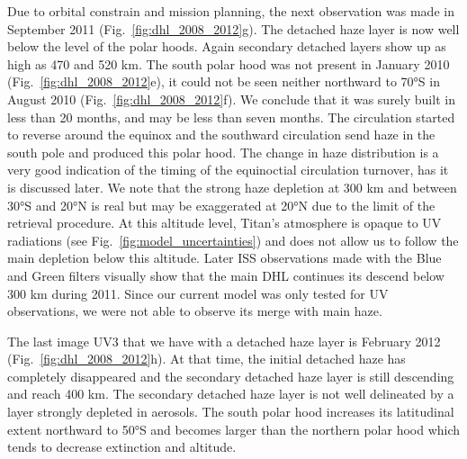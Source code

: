 Due to orbital constrain and mission planning, the next observation was made in September 2011
(Fig.~\ref{fig:dhl_2008_2012}g). The detached haze layer is now well below the level of the polar hoods.
Again secondary detached layers show up as high as 470 and 520 km.
The south polar hood was not present in January 2010 (Fig.~\ref{fig:dhl_2008_2012}e), it could not be seen
neither northward to \ang{70}S in August 2010 (Fig.~\ref{fig:dhl_2008_2012}f). We conclude that it was surely
built in less than 20 months, and may be less than seven months. The circulation started to reverse around the equinox
and the southward circulation send haze in the south pole and produced this polar hood. The change in haze distribution
is a very good indication of the timing of the equinoctial circulation turnover, has it is discussed later. We note
that the strong haze depletion at 300 km and between \ang{30}S and \ang{20}N is real but may be exaggerated at \ang{20}N
due to the limit of the retrieval procedure. At this altitude level, Titan's atmosphere is opaque to UV radiations
(see Fig.~\ref{fig:model_uncertainties}) and does not allow us to follow the main depletion below this altitude.
Later ISS observations made with the Blue and Green filters visually show that the main DHL continues
its descend below 300 km during 2011. Since our current model was only tested for UV observations, we were not able
to observe its merge with main haze.

The last image UV3 that we have with a detached haze layer is February 2012 (Fig.~\ref{fig:dhl_2008_2012}h). At that
time, the initial detached haze has completely disappeared and the secondary detached haze layer is still descending
and reach 400 km. The secondary detached haze layer is not well delineated by a layer strongly depleted in aerosols.
The south polar hood increases its latitudinal extent northward to \ang{50}S and becomes larger than the northern
polar hood which tends to decrease extinction and altitude.
